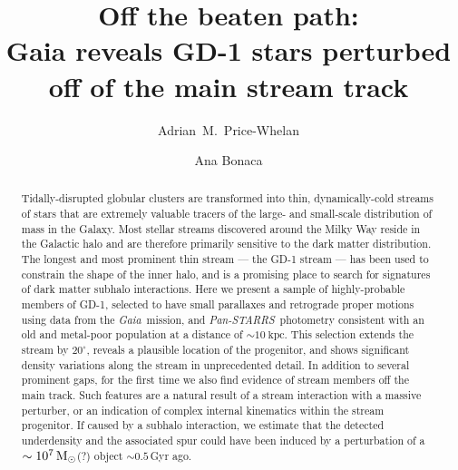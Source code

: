 \documentclass[modern]{aastex62}
\newcommand{\gaia}{\textsl{Gaia}}
\newcommand{\pans}{\textsl{Pan-STARRS}}
\newcommand{\kpc}{\textrm{kpc}}
\begin{document}
\sloppy\sloppypar\raggedbottom\frenchspacing %

\title{Off the beaten path: \\
       Gaia reveals GD-1 stars perturbed off of the main stream track}

\author[0000-0003-0872-7098]{Adrian~M.~Price-Whelan}

\author[0000-0002-7846-9787]{Ana Bonaca}

\begin{abstract}\noindent %
Tidally-disrupted globular clusters are transformed into thin, dynamically-cold
streams of stars that are extremely valuable tracers of the large- and
small-scale distribution of mass in the Galaxy.
Most stellar streams discovered around the Milky Way reside in the Galactic halo
and are therefore primarily sensitive to the dark matter distribution.
The longest and most prominent thin stream --- the GD-1 stream --- has been used
to constrain the shape of the inner halo, and is a promising place to search for
signatures of dark matter subhalo interactions.
Here we present a sample of highly-probable members of GD-1, selected to have
small parallaxes and retrograde proper motions using data from the \gaia\
mission, and \pans\ photometry consistent with an old and metal-poor population
at a distance of $\sim10~\kpc$.
This selection extends the stream by $20^\circ$, reveals a plausible location of
the progenitor, and shows significant density variations along the stream in
unprecedented detail.
In addition to several prominent gaps, for the first time we also find evidence
of stream members off the main track.
Such features are a natural result of a stream interaction with a massive
perturber, or an indication of complex internal kinematics within the
stream progenitor.
If caused by a subhalo interaction, we estimate that the detected underdensity
and the associated spur could have been induced by a perturbation of a
$\sim10^7\,\rm M_\odot$(?) object $\sim 0.5\,$Gyr ago.
\end{abstract}
\end{document}
